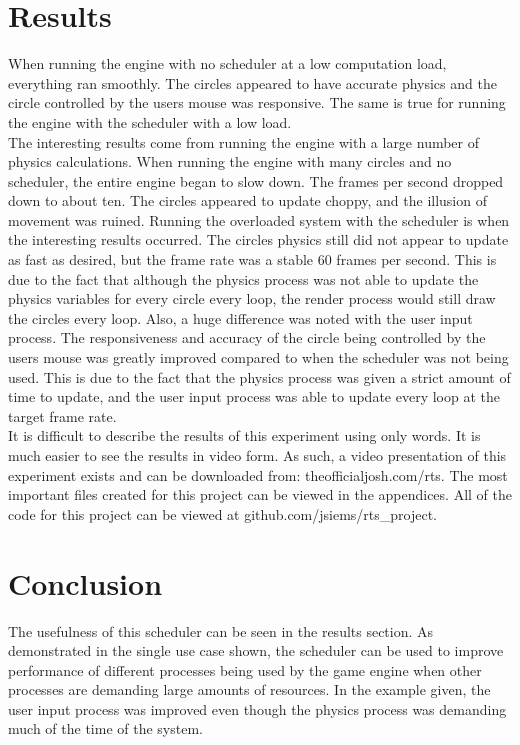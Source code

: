 \documentclass[a4paper, 12pt]{article}
\begin{document}
\section{Results}
    
    When running the engine with no scheduler at a low computation load, everything ran smoothly. The circles appeared to have accurate physics and the circle controlled by the users mouse was responsive. The same is true for running the engine with the scheduler with a low load.
    \\

    The interesting results come from running the engine with a large number of physics calculations. When running the engine with many circles and no scheduler, the entire engine began to slow down. The frames per second dropped down to about ten. The circles appeared to update choppy, and the illusion of movement was ruined. Running the overloaded system with the scheduler is when the interesting results occurred. The circles physics still did not appear to update as fast as desired, but the frame rate was a stable 60 frames per second. This is due to the fact that although the physics process was not able to update the physics variables for every circle every loop, the render process would still draw the circles every loop. Also, a huge difference was noted with the user input process. The responsiveness and accuracy of the circle being controlled by the users mouse was greatly improved compared to when the scheduler was not being used. This is due to the fact that the physics process was given a strict amount of time to update, and the user input process was able to update every loop at the target frame rate. 
    \\

    It is difficult to describe the results of this experiment using only words. It is much easier to see the results in video form. As such, a video presentation of this experiment exists and can be downloaded from: theofficialjosh.com/rts. The most important files created for this project can be viewed in the appendices. All of the code for this project can be viewed at github.com/jsiems/rts\_project.

\section{Conclusion}
    The usefulness of this scheduler can be seen in the results section. As demonstrated in the single use case shown, the scheduler can be used to improve performance of different processes being used by the game engine when other processes are demanding large amounts of resources. In the example given, the user input process was improved even though the physics process was demanding much of the time of the system. 
    \\
\end{document}
